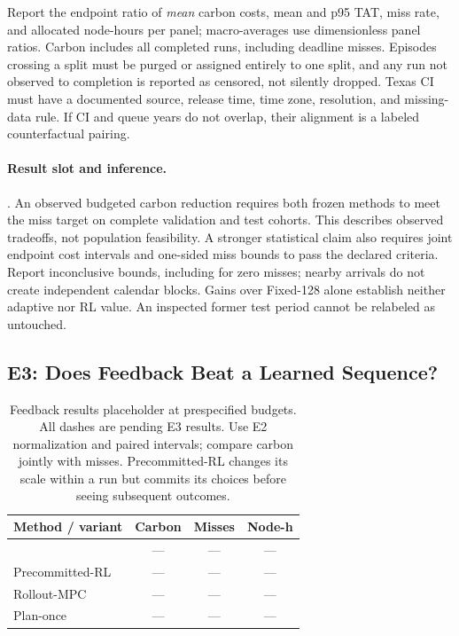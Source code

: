 Report the endpoint ratio of \emph{mean} carbon costs, mean and p95 TAT,
miss rate, and allocated node-hours per panel; macro-averages use dimensionless
panel ratios. Carbon includes all completed runs, including deadline misses.
Episodes crossing a split must be purged or assigned entirely to one split,
and any run not observed to completion is reported as censored, not silently
dropped. Texas CI must have a documented source, release time, time zone,
resolution, and missing-data rule. If CI and queue years do not overlap,
their alignment is a labeled counterfactual pairing.

\paragraph{Result slot and inference.}
.
An observed budgeted carbon reduction requires both frozen methods to meet
the miss target on complete validation and test cohorts. This describes
observed tradeoffs, not population feasibility. A stronger statistical claim
also requires joint endpoint cost intervals and one-sided miss bounds to pass
the declared criteria. Report inconclusive bounds, including for zero misses;
nearby arrivals do not create independent calendar blocks. Gains over
Fixed-128 alone establish neither adaptive nor RL value. An inspected former
test period cannot be relabeled as untouched.

\subsection{E3: Does Feedback Beat a Learned Sequence?}

\begin{table}[t]
\centering\small
\begin{tabular}{@{}lccc@{}}
\toprule
Method / variant & Carbon & Misses & Node-h \\
\midrule
\name{} & --- & --- & --- \\
Precommitted-RL & --- & --- & --- \\
Rollout-MPC & --- & --- & --- \\
Plan-once & --- & --- & --- \\
\bottomrule
\end{tabular}
\caption{Feedback results placeholder at prespecified budgets. All dashes
are pending E3 results. Use E2 normalization and paired intervals; compare
carbon jointly with misses. Precommitted-RL changes its scale within a run
but commits its choices before seeing subsequent outcomes.}
\label{tab:ablation}
\end{table}

